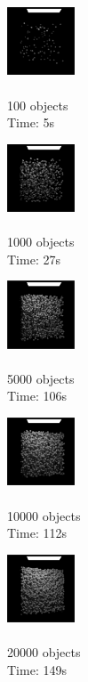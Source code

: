\documentclass[12pt,a4paper,english]{article}
\begin{document}
\begin{multicols}{5}
    \begin{figure}[H]
        \includegraphics[width=0.18\textwidth]{bvh-100}
        \caption[]{\\100 objects\\Time: 5s}
        \label{fig:bvh-100}
    \end{figure}
    \columnbreak
    \begin{figure}[H]
        \includegraphics[width=0.18\textwidth]{bvh-1000}
        \caption[]{\\1000 objects\\Time: 27s}
        \label{fig:bvh-1000}
    \end{figure}
    \columnbreak
    \begin{figure}[H]
        \includegraphics[width=0.18\textwidth]{bvh-5000}
        \caption[]{\\5000 objects\\Time: 106s}
        \label{fig:bvh-5000}
    \end{figure}
    \columnbreak
    \begin{figure}[H]
        \includegraphics[width=0.18\textwidth]{bvh-10000}
        \caption[]{\\10000 objects\\Time: 112s}
        \label{fig:bvh-10000}
    \end{figure}
    \columnbreak
    \begin{figure}[H]
        \includegraphics[width=0.18\textwidth]{bvh-20000}
        \caption[]{\\20000 objects\\Time: 149s}
        \label{fig:bvh-20000}
    \end{figure}
\end{multicols}
\end{document}
